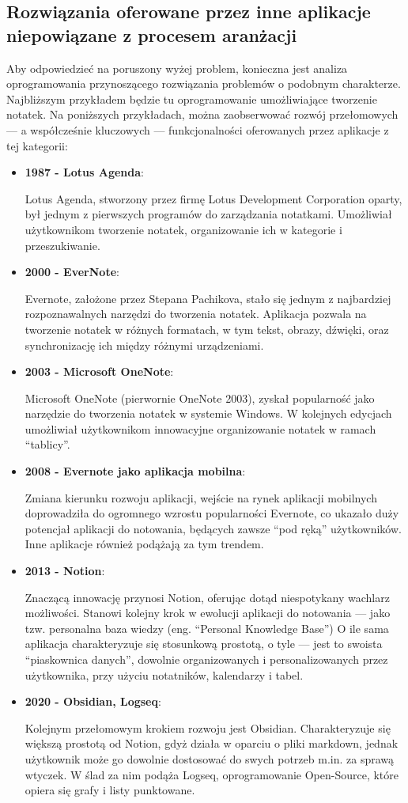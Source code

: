 \subsection{Rozwiązania oferowane przez inne aplikacje niepowiązane z procesem aranżacji}
Aby odpowiedzieć na poruszony wyżej problem, konieczna jest analiza oprogramowania przynoszącego rozwiązania problemów
o podobnym charakterze. Najbliższym przykładem będzie tu oprogramowanie umożliwiające tworzenie notatek.
Na poniższych przykładach, można zaobserwować rozwój przełomowych — a współcześnie kluczowych — funkcjonalności oferowanych
przez aplikacje z tej kategorii:
\begin{itemize}
	\item \textbf{1987 - Lotus Agenda}:

	      Lotus Agenda, stworzony przez firmę Lotus Development Corporation oparty, był jednym z pierwszych programów do
	      zarządzania notatkami.
	      Umożliwiał użytkownikom tworzenie notatek, organizowanie ich w kategorie i przeszukiwanie.
	\item \textbf{2000 - EverNote}:

	      Evernote, założone przez Stepana Pachikova, stało się jednym z najbardziej rozpoznawalnych narzędzi do tworzenia
	      notatek.
	      Aplikacja pozwala na tworzenie notatek w różnych formatach, w tym tekst, obrazy, dźwięki,
	      oraz synchronizację ich między różnymi urządzeniami.
	\item \textbf{2003 - Microsoft OneNote}:

	      Microsoft OneNote (pierwornie OneNote 2003), zyskał popularność jako narzędzie do tworzenia notatek w systemie
	      Windows.
	      W kolejnych edycjach umożliwiał użytkownikom innowacyjne organizowanie notatek w ramach \enquote{tablicy}.
	\item \textbf{2008 - Evernote jako aplikacja mobilna}:

	      Zmiana kierunku rozwoju aplikacji, wejście na rynek aplikacji mobilnych doprowadziła do ogromnego wzrostu popularności Evernote,
	      co ukazało duży potencjał aplikacji do notowania, będących zawsze \enquote{pod ręką} użytkowników.
	      Inne aplikacje również podążają za tym trendem.
	\item \textbf{2013 - Notion}:

	      Znaczącą innowację przynosi Notion, oferując dotąd niespotykany wachlarz możliwości.
	      Stanowi kolejny krok w ewolucji aplikacji do notowania — jako tzw. personalna baza wiedzy (eng.
	      \enquote{Personal Knowledge Base})
	      O ile sama aplikacja charakteryzuje się stosunkową prostotą, o tyle — jest to swoista \enquote{piaskownica danych},
	      dowolnie organizowanych i personalizowanych przez użytkownika, przy użyciu notatników, kalendarzy i tabel.
	\item \textbf{2020 - Obsidian, Logseq}:

	      Kolejnym przełomowym krokiem rozwoju jest Obsidian. Charakteryzuje się większą prostotą od Notion,
	      gdyż działa w oparciu o pliki markdown, jednak użytkownik może go dowolnie dostosować do swych potrzeb m.in.
	      za sprawą
	      wtyczek. W ślad za nim podąża Logseq, oprogramowanie Open-Source, które opiera się grafy i listy punktowane.
\end{itemize}
